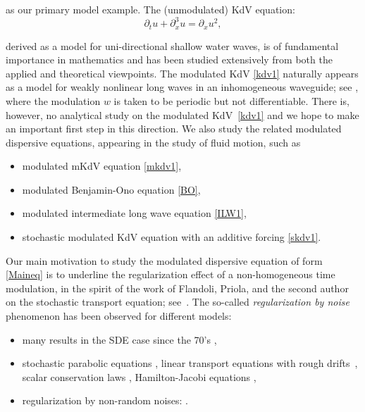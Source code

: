\documentclass[letterpaper, 11pt,  reqno]{amsart}
\newcommand{\1}{\hspace{0.5mm}\text{I}\hspace{0.5mm}}
\newcommand{\noi}{\noindent}
\newcommand{\dx}{\partial_x}
\newcommand{\dt}{\partial_t}
\numberwithin{equation}{section}
\numberwithin{theorem}{section}
\begin{document}
\noi
as our primary model example. 
The (unmodulated) KdV equation:
\begin{equation}
\dt u+  \dx^3 u  =\dx u^2, 
\label{kdv2}
\end{equation}


\noi
derived as a model for uni-directional shallow water waves, 
is of fundamental importance
 in mathematics and has been studied extensively
 from both the applied and theoretical viewpoints.
The modulated KdV \eqref{kdv1} naturally appears 
as a model 
for
weakly nonlinear long waves in an inhomogeneous waveguide;
see \cite{CMG, HZ}, where 
the modulation $w$ is taken to be periodic but not differentiable.
There is, however, no analytical study  on the modulated KdV~\eqref{kdv1}
and we hope to make an important first step in this direction.
We also study the related modulated dispersive equations, 
appearing in the study of fluid motion, 
such as 

\smallskip
\begin{itemize}
\item modulated mKdV equation \eqref{mkdv1}, 

\smallskip
\item 
modulated Benjamin-Ono equation \eqref{BO}, 

\smallskip
\item 
modulated intermediate long wave equation \eqref{ILW1}, 

\smallskip
\item 
stochastic modulated KdV equation with an additive forcing \eqref{skdv1}.

\end{itemize}




Our main motivation to study the modulated dispersive equation of 
form \eqref{Maineq} 
is 
to underline the regularization effect of a non-homogeneous time modulation,
in the spirit of the  work of Flandoli, Priola, and the second author on the stochastic transport equation; 
see~\cite{FGP}. 
The so-called {\it regularization by noise}
phenomenon
 has been observed for different models:



\smallskip

\begin{itemize}
\item
many results in the SDE case since the 70's
\cite{Zv, Ver, KR, Davie, DF, 
CatellierGubinelli, DFRV}, 



\smallskip
\item 
stochastic parabolic equations
\cite{GLT, DGT12, BM}, 
linear transport equations with rough drifts~\cite{FGP}, 
scalar conservation laws \cite{CGess},  
Hamilton-Jacobi equations \cite{LS}, 




\smallskip
\item 
regularization by non-random noises:
\cite{GG0, FHLN, RT}.

\end{itemize}
\end{document}
